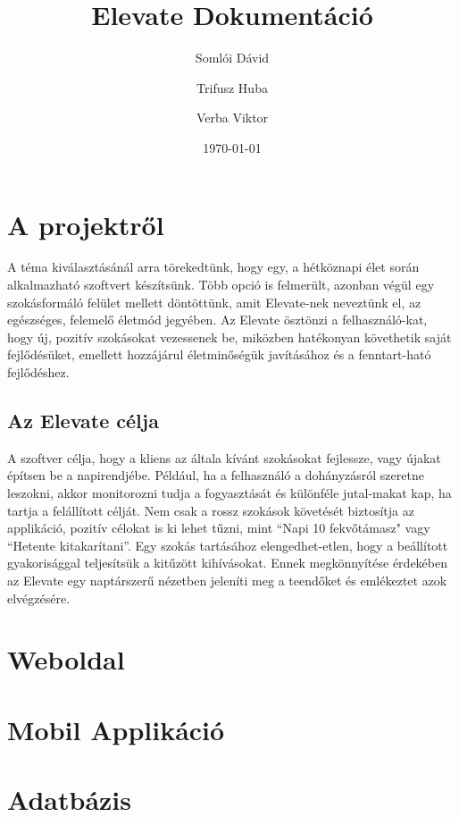 \documentclass[12pt]{report}
\begin{document}
\title{Elevate Dokumentáció}
\author{Somlói Dávid
        \and
        Trifusz Huba
        \and
        Verba Viktor}
\date{\today}

\maketitle

\setcounter{tocdepth}{3}
\tableofcontents

\chapter{A projektről}
\begin{sloppypar}
A téma kiválasztásánál arra törekedtünk, hogy egy, a hétköznapi élet során alkalmazható szoftvert készítsünk. Több opció is felmerült, azonban végül egy szokásformáló felület mellett döntöttünk, amit Elevate-nek neveztünk el, az egészséges, felemelő életmód jegyében. Az Elevate ösztönzi a felhasználó-kat, hogy új, pozitív szokásokat vezessenek be, miközben hatékonyan követhetik saját fejlődésüket, emellett hozzájárul életminőségük javításához és a fenntart-ható fejlődéshez.
\end{sloppypar}
\section{Az Elevate célja}
\begin{sloppypar}
A szoftver célja, hogy a kliens az általa kívánt szokásokat fejlessze, vagy újakat építsen be a napirendjébe. Például, ha a felhasználó a dohányzásról szeretne leszokni, akkor monitorozni tudja a fogyasztását és különféle jutal-makat kap, ha tartja a felállított célját. Nem csak a rossz szokások követését biztosítja az applikáció, pozitív célokat is ki lehet tűzni, mint “Napi 10 fekvőtámasz" vagy “Hetente kitakarítani”. Egy szokás tartásához elengedhet-etlen, hogy a beállított gyakorisággal teljesítsük a kitűzött kihívásokat. Ennek megkönnyítése érdekében az Elevate egy naptárszerű nézetben jeleníti meg a teendőket és emlékeztet azok elvégzésére. 
\end{sloppypar}
\chapter{Weboldal}
\chapter{Mobil Applikáció}
\chapter{Adatbázis}
\end{document}

